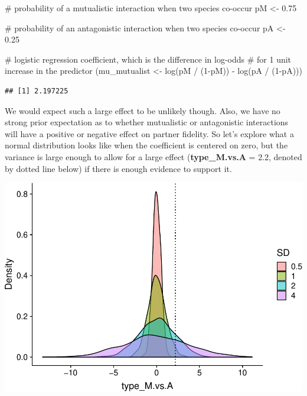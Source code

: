 \documentclass[11pt,]{article}
\newenvironment{Shaded}{}{}
\newcommand{\KeywordTok}[1]{\textcolor[rgb]{0.00,0.00,1.00}{#1}}
\newcommand{\DecValTok}[1]{#1}
\newcommand{\FloatTok}[1]{#1}
\newcommand{\StringTok}[1]{\textcolor[rgb]{0.00,0.50,0.50}{#1}}
\newcommand{\CommentTok}[1]{\textcolor[rgb]{0.00,0.50,0.00}{#1}}
\newcommand{\OperatorTok}[1]{#1}
\newcommand{\NormalTok}[1]{#1}
\let\origfigure\figure
\let\endorigfigure\endfigure
\renewenvironment{figure}[1][2] {
    \expandafter\origfigure\expandafter[H]
} {
    \endorigfigure
}
\begin{document}
\begin{Shaded}
\begin{Highlighting}[]
\CommentTok{# probability of a mutualistic interaction when two species co-occur}
\NormalTok{pM <-}\StringTok{ }\FloatTok{0.75}  

\CommentTok{# probability of an antagonistic interaction when two species co-occur}
\NormalTok{pA <-}\StringTok{ }\FloatTok{0.25} 

\CommentTok{# logistic regression coefficient, which is the difference in log-odds }
\CommentTok{# for 1 unit increase in the predictor}
\NormalTok{(mu_mutualist <-}\StringTok{ }\KeywordTok{log}\NormalTok{(pM }\OperatorTok{/}\StringTok{ }\NormalTok{(}\DecValTok{1}\OperatorTok{-}\NormalTok{pM)) }\OperatorTok{-}\StringTok{ }\KeywordTok{log}\NormalTok{(pA }\OperatorTok{/}\StringTok{ }\NormalTok{(}\DecValTok{1}\OperatorTok{-}\NormalTok{pA))) }
\end{Highlighting}
\end{Shaded}

\begin{verbatim}
## [1] 2.197225
\end{verbatim}

We would expect such a large effect to be unlikely though. Also, we have
no strong prior expectation as to whether mutualistic or antagonistic
interactions will have a positive or negative effect on partner
fidelity. So let's explore what a normal distribution looks like when
the coefficient is centered on zero, but the variance is large enough to
allow for a large effect (\textbf{type\_M.vs.A} = 2.2, denoted by dotted
line below) if there is enough evidence to support it.

\begin{figure}
\centering
\includegraphics{reproduce_analyses_files/figure-latex/simulate prior distribution for type-1.pdf}
\caption{Simulating prior distributions for the effect of interaction
type.}
\end{figure}
\end{document}
